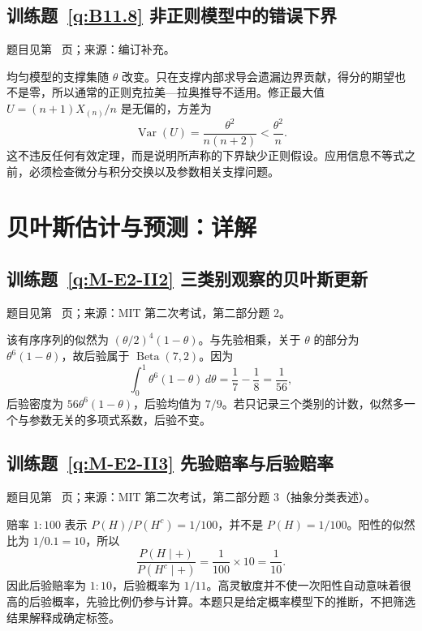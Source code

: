 \subsection*{训练题~\ref{q:B11.8} 非正则模型中的错误下界}\label{a:B11.8}{\small 题目见第~\pageref{q:B11.8} 页；来源：编订补充。}
\begin{solve}均匀模型的支撑集随 $\theta$ 改变。只在支撑内部求导会遗漏边界贡献，得分的期望也不是零，所以通常的正则克拉美—拉奥推导不适用。修正最大值 $U=(n+1)X_{(n)}/n$ 是无偏的，方差为\[\operatorname{Var}(U)=\frac{\theta^2}{n(n+2)}<\frac{\theta^2}{n}.\]这不违反任何有效定理，而是说明所声称的下界缺少正则假设。应用信息不等式之前，必须检查微分与积分交换以及参数相关支撑问题。\end{solve}

\clearpage\section*{贝叶斯估计与预测：详解}

\subsection*{训练题~\ref{q:M-E2-II2} 三类别观察的贝叶斯更新}\label{a:M-E2-II2}{\small 题目见第~\pageref{q:M-E2-II2} 页；来源：MIT 第二次考试，第二部分题 2。}
\begin{solve}该有序序列的似然为 $(\theta/2)^4(1-\theta)$。与先验相乘，关于 $\theta$ 的部分为 $\theta^6(1-\theta)$，故后验属于 $\operatorname{Beta}(7,2)$。因为\[\int_0^1\theta^6(1-\theta)\,d\theta=\frac17-\frac18=\frac1{56},\]后验密度为 $56\theta^6(1-\theta)$，后验均值为 $7/9$。若只记录三个类别的计数，似然多一个与参数无关的多项式系数，后验不变。\end{solve}

\subsection*{训练题~\ref{q:M-E2-II3} 先验赔率与后验赔率}\label{a:M-E2-II3}{\small 题目见第~\pageref{q:M-E2-II3} 页；来源：MIT 第二次考试，第二部分题 3（抽象分类表述）。}
\begin{solve}赔率 $1:100$ 表示 $P(H)/P(H^c)=1/100$，并不是 $P(H)=1/100$。阳性的似然比为 $1/0.1=10$，所以\[\frac{P(H\mid+)}{P(H^c\mid+)}=\frac1{100}\times10=\frac1{10}.\]因此后验赔率为 $1:10$，后验概率为 $1/11$。高灵敏度并不使一次阳性自动意味着很高的后验概率，先验比例仍参与计算。本题只是给定概率模型下的推断，不把筛选结果解释成确定标签。\end{solve}

